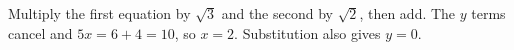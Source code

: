 Multiply the first equation by $\sqrt3$ and the second by $\sqrt2$, then add. The $y$ terms cancel and $5x=6+4=10$, so $\boxed{x=2}$. Substitution also gives $y=0$.

